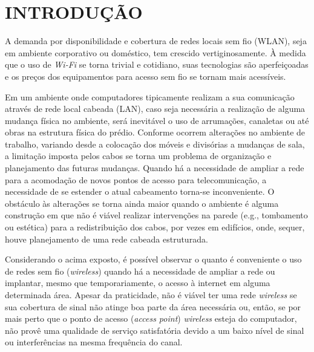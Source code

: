 \documentclass[
	12pt,				%
	twoside,			%
	a4paper,			%
	english,			%
	french,				%
	spanish,			%
	brazil				%
	]{abntex2}
\begin{document}
\textual

\chapter{INTRODUÇÃO}\label{introduuxe7uxe3o}

A demanda por disponibilidade e cobertura de redes locais sem fio
(WLAN), seja em ambiente corporativo ou doméstico, tem crescido
vertiginosamente. À medida que o uso de \emph{Wi-Fi} se torna trivial e
cotidiano, suas tecnologias são aperfeiçoadas e os preços dos
equipamentos para acesso sem fio se tornam mais
acessíveis\cite{MARQUES}.

Em um ambiente onde computadores tipicamente realizam a sua comunicação
através de rede local cabeada (LAN), caso seja necessária a realização
de alguma mudança física no ambiente, será inevitável o uso de
arrumações, canaletas ou até obras na estrutura física do prédio.
Conforme ocorrem alterações no ambiente de trabalho, variando desde a
colocação dos móveis e divisórias a mudanças de sala, a limitação
imposta pelos cabos se torna um problema de organização e planejamento
das futuras mudanças. Quando há a necessidade de ampliar a rede para a
acomodação de novos pontos de acesso para telecomunicação, a necessidade
de se estender o atual cabeamento torna-se inconveniente. O obstáculo às
alterações se torna ainda maior quando o ambiente é alguma construção em
que não é viável realizar intervenções na parede (e.g., tombamento ou
estética) para a redistribuição dos cabos, por vezes em edifícios, onde,
sequer, houve planejamento de uma rede cabeada estruturada.

Considerando o acima exposto, é possível observar o quanto é conveniente
o uso de redes sem fio (\emph{wireless}) quando há a necessidade de
ampliar a rede ou implantar, mesmo que temporariamente, o acesso à
internet em alguma determinada área. Apesar da praticidade, não é viável
ter uma rede \emph{wireless} se sua cobertura de sinal não atinge boa
parte da área necessária ou, então, se por mais perto que o ponto de
acesso (\emph{access point}) \emph{wireless} esteja do computador, não
provê uma qualidade de serviço satisfatória devido a um baixo nível de
sinal ou interferências na mesma frequência do canal.
\end{document}
